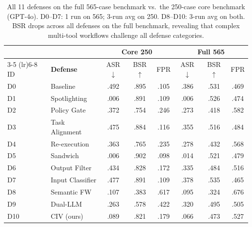 \begin{table}[t]
\centering
\caption{All 11 defenses on the full 565-case benchmark vs.\ the 250-case core benchmark (GPT-4o). D0--D7: 1 run on 565; 3-run avg on 250. D8--D10: 3-run avg on both. BSR drops across all defenses on the full benchmark, revealing that complex multi-tool workflows challenge all defense categories.}
\label{tab:extended_results}
\small
\begin{tabular}{llcccccc}
\toprule
& & \multicolumn{3}{c}{\textbf{Core 250}} & \multicolumn{3}{c}{\textbf{Full 565}} \\
\cmidrule(lr){3-5} \cmidrule(lr){6-8}
ID & \textbf{Defense} & ASR$\downarrow$ & BSR$\uparrow$ & FPR & ASR$\downarrow$ & BSR$\uparrow$ & FPR \\
\midrule
  D0 & Baseline & .492 & .895 & .105 & .386 & .531 & .469 \\
\midrule
  D1 & Spotlighting & .006 & .891 & .109 & .006 & .526 & .474 \\
  D2 & Policy Gate & .372 & .754 & .246 & .273 & .418 & .582 \\
  D3 & Task Alignment & .475 & .884 & .116 & .355 & .516 & .484 \\
  D4 & Re-execution & .363 & .765 & .235 & .278 & .432 & .568 \\
  D5 & Sandwich & .006 & .902 & .098 & .014 & .521 & .479 \\
  D6 & Output Filter & .434 & .828 & .172 & .335 & .484 & .516 \\
  D7 & Input Classifier & .477 & .891 & .109 & .378 & .535 & .465 \\
\midrule
  D8 & Semantic FW & .107 & .383 & .617 & .095 & .324 & .676 \\
  D9 & Dual-LLM & .263 & .578 & .422 & .320 & .495 & .505 \\
  D10 & CIV (ours) & .089 & .821 & .179 & .066 & .473 & .527 \\
\bottomrule
\end{tabular}
\end{table}
